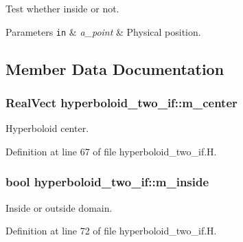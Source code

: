 Test whether inside or not. 


\begin{DoxyParams}[1]{Parameters}
\mbox{\tt in}  & {\em a\+\_\+point} & Physical position. \\
\hline
\end{DoxyParams}


\subsection{Member Data Documentation}
\subsubsection[{\texorpdfstring{m\+\_\+center}{m_center}}]{\setlength{\rightskip}{0pt plus 5cm}Real\+Vect hyperboloid\+\_\+two\+\_\+if\+::m\+\_\+center\hspace{0.3cm}{\ttfamily [protected]}}\hypertarget{classhyperboloid__two__if_a302c23912c2a8e7445c261a7a5c9b047}{}\label{classhyperboloid__two__if_a302c23912c2a8e7445c261a7a5c9b047}


Hyperboloid center. 



Definition at line 67 of file hyperboloid\+\_\+two\+\_\+if.\+H.

\subsubsection[{\texorpdfstring{m\+\_\+inside}{m_inside}}]{\setlength{\rightskip}{0pt plus 5cm}bool hyperboloid\+\_\+two\+\_\+if\+::m\+\_\+inside\hspace{0.3cm}{\ttfamily [protected]}}\hypertarget{classhyperboloid__two__if_a69d70f47d35b45026d3c9632404ea36e}{}\label{classhyperboloid__two__if_a69d70f47d35b45026d3c9632404ea36e}


Inside or outside domain. 



Definition at line 72 of file hyperboloid\+\_\+two\+\_\+if.\+H.

